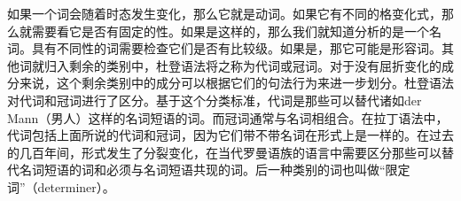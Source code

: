 如果一个词会随着时态发生变化，那么它就是动词。如果它有不同的格变化式，那么就需要看它是否有固定的性。如果是这样的，那么我们就知道分析的是一个名词。具有不同性的词需要检查它们是否有比较级。如果是，那它可能是形容词。其他词就归入剩余的类别中，杜登语法将之称为代词或冠词。对于没有屈折变化的成分来说，这个剩余类别中的成分可以根据它们的句法行为来进一步划分。杜登语法对代词和冠词进行了区分。基于这个分类标准，代词是那些可以替代诸如der
Mann（男人）这样的名词短语的词。而冠词通常与名词相组合。在拉丁语法中，代词包括上面所说的代词和冠词，因为它们带不带名词在形式上是一样的。在过去的几百年间，形式发生了分裂变化，在当代罗曼语族的语言中需要区分那些可以替代名词短语的词和必须与名词短语共现的词。后一种类别的词也叫做“限定词”（determiner）。


